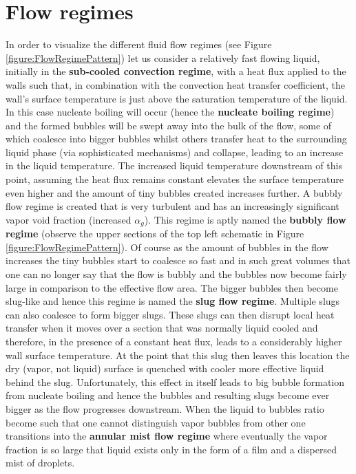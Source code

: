 \documentclass[11pt,letterpaper,titlepage]{article}
\begin{document}
\section{Flow regimes}
In order to visualize the different fluid flow regimes (see Figure \ref{figure:FlowRegimePattern}) let us consider a relatively fast flowing liquid, initially in the \textbf{sub-cooled convection regime}, with a heat flux applied to the walls such that, in combination with the convection heat transfer coefficient, the wall's surface temperature is just above the saturation temperature of the liquid. In this case nucleate boiling will occur (hence the \textbf{nucleate boiling regime}) and the formed bubbles will be swept away into the bulk of the flow, some of which coalesce into bigger bubbles whilst others transfer heat to the surrounding liquid phase (via sophisticated mechanisms) and collapse, leading to an increase in the liquid temperature. The increased liquid temperature downstream of this point, assuming the heat flux remains constant elevates the surface temperature even higher and the amount of tiny bubbles created increases further. A bubbly flow regime is created that is very turbulent and has an increasingly significant vapor void fraction (increased $\alpha_g$). This regime is aptly named the \textbf{bubbly flow regime} (observe the upper sections of the top left schematic in Figure \ref{figure:FlowRegimePattern}).
\newline
\newline
Of course as the amount of bubbles in the flow increases the tiny bubbles start to coalesce so fast and in such great volumes that one can no longer say that the flow is bubbly and the bubbles now become fairly large in comparison to the effective flow area. The bigger bubbles then become slug-like and hence this regime is named the \textbf{slug flow regime}. Multiple slugs can also coalesce to form bigger slugs. These slugs can then disrupt local heat transfer when it moves over a section that was normally liquid cooled and therefore, in the presence of a constant heat flux, leads to a considerably higher wall surface temperature. At the point that this slug then leaves this location the dry (vapor, not liquid) surface is quenched with cooler more effective liquid behind the slug. Unfortunately, this effect in itself leads to big bubble formation from nucleate boiling and hence the bubbles and resulting slugs become ever bigger as the flow progresses downstream. When the liquid to bubbles ratio become such that one cannot distinguish vapor bubbles from other one transitions into the \textbf{annular mist flow regime} where eventually the vapor fraction is so large that liquid exists only in the form of a film and a dispersed mist of droplets.
\end{document}
